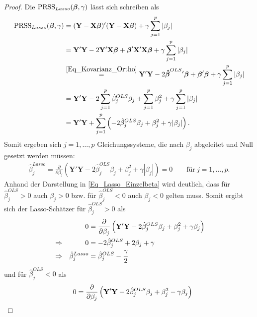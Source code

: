 \documentclass[12pt, a4paper]{report}\usepackage[]{graphicx}\usepackage[]{color}
\begin{document}
\begin{appendix}
\begin{proof}
Die $\textnormal{PRSS}_{Lasso}(\boldsymbol{\beta}, \gamma)$ lässt sich schreiben als
\begin{align*}
\text{PRSS}_{Lasso}(\boldsymbol{\beta}, \gamma)
&=(\mathbf{Y}-\mathbf{X}\boldsymbol{\beta})'(\mathbf{Y}-\mathbf{X}\boldsymbol{\beta})+ \gamma \sum_{j=1}^{p} |\beta_j| \notag \\
&=\mathbf{Y}'\mathbf{Y}-2\mathbf{Y}'\mathbf{X}\boldsymbol{\beta} + \boldsymbol{\beta}'\mathbf{X}'\mathbf{X}\boldsymbol{\beta} + \gamma \sum_{j=1}^{p} |\beta_j| \notag \\
&\stackrel{\eqref{Eq_Kovarianz_Ortho}}{=}\mathbf{Y}'\mathbf{Y}-2\boldsymbol{\hat{\beta}}^{OLS}{'}\boldsymbol{\beta} + \boldsymbol{\beta}'\boldsymbol{\beta}+ \gamma \sum_{j=1}^{p} |\beta_j| \notag \\
&=\mathbf{Y}'\mathbf{Y}-2 \sum_{j=1}^{p}\hat{\beta}_j^{OLS} \beta_j + \sum_{j=1}^{p} \beta_j^2 + \gamma \sum_{j=1}^{p} |\beta_j| \notag \\
&=\mathbf{Y}'\mathbf{Y}+\sum_{j=1}^{p}\left( -2 \hat{\beta}_j^{OLS}  \beta_j + \beta_j^2 + \gamma |\beta_j| \right).
\end{align*}
Somit ergeben sich $j=1,\dots,p$ Gleichungssysteme, die nach $\beta_j$ abgeleitet und Null gesetzt werden müssen:
\begin{align}\label{Eq_Lasso_Einzelbeta}
\hat{\beta}_j^{Lasso}=\frac{\partial}{\partial \beta_j} \left( \mathbf{Y}'\mathbf{Y} -2\hat{\beta}_j^{OLS} \beta_j + \beta_j^2 + \gamma |\beta_j| \right) =0 \qquad \text{für} \ j=1,\dots,p .
\end{align}
Anhand der Darstellung in \eqref{Eq_Lasso_Einzelbeta} wird deutlich, dass für $\hat{\beta}_j^{OLS}>0$  auch $\beta_j > 0$ bzw. für $\hat{\beta}_j^{OLS}<0$ auch $\beta_j < 0$ gelten muss. Somit ergibt sich der Lasso-Schätzer für $\hat{\beta}_j^{OLS}>0$ als
\begin{align}\label{Eq_Lasso_Ortho_Beta_greater0}
&& 0&=\frac{\partial}{\partial \beta_j} \left( \mathbf{Y}'\mathbf{Y} -2\hat{\beta}_j^{OLS}  \beta_j + \beta_j^2 + \gamma \beta_j \right) \notag \\
&\Rightarrow& 0&=-2\hat{\beta}_j^{OLS} + 2\beta_j + \gamma \notag \\
&\Rightarrow& \hat{\beta}_j^{Lasso}&=\hat{\beta}_j^{OLS}-\frac{\gamma}{2} 
\end{align}
und für $\hat{\beta}_j^{OLS}<0$ als
\begin{align}\label{Eq_Lasso_Ortho_Beta_smaller0}
&& 0&=\frac{\partial}{\partial \beta_j} \left( \mathbf{Y}'\mathbf{Y} -2\hat{\beta}_j^{OLS}  \beta_j + \beta_j^2 - \gamma \beta_j \right) \notag \\

\end{align}
\end{proof}
\end{appendix}
\end{document}
